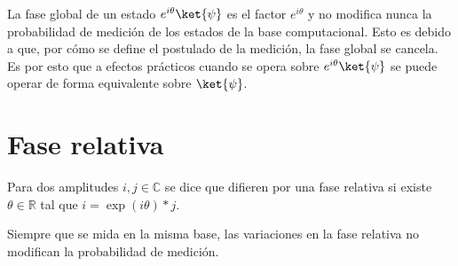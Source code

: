 La fase global de un estado $e^{i \theta}\ket{\psi}$ es el factor $e^{i \theta}$ y no modifica nunca la probabilidad de medición de los estados de la base computacional.
Esto es debido a que, por cómo se define el postulado de la medición, la fase global se cancela.
\\
Es por esto que a efectos prácticos cuando se opera sobre $e^{i \theta}\ket{\psi}$ se puede operar de forma equivalente sobre $\ket{\psi}$.


\section{Fase relativa\label{sec:8-concepto-fase_relativa}}
Para dos amplitudes $i, j \in \mathbb{C}$ se dice que difieren por una fase relativa si existe $\theta \in \mathbb{R}$ tal que $i = \exp(i \theta)*j$.

Siempre que se mida en la misma base, las variaciones en la fase relativa no modifican la probabilidad de medición.



